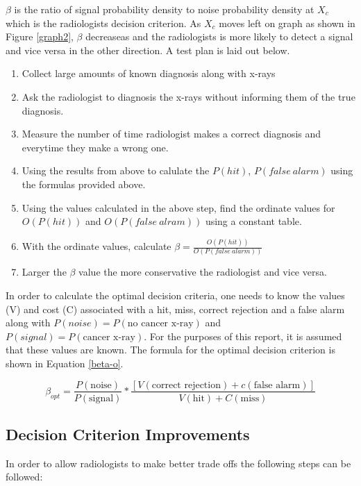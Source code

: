 \documentclass[12pt]{article}
\begin{document}
	$\beta$ is the ratio of signal probability density to noise probability density at $X_c$ which is the radiologists decision criterion. As $X_c$ moves left on graph as shown in Figure \ref{graph2}, $\beta$ decreaseas and the radiologists is more likely to detect a signal and vice versa in the other direction. A test plan is laid out below.
	
	\begin{enumerate}
		\item Collect large amounts of known diagnosis along with x-rays
		\item Ask the radiologist to diagnosis the x-rays without informing them of the true diagnosis.
		\item Measure the number of time radiologist makes a correct diagnosis and everytime they make a wrong one.
		\item Using the results from above to calulate the $P(hit)$, $P(false\ alarm)$ using the formulas provided above.
		\item Using the values calculated in the above step, find the ordinate values for $O(P(hit))$ and $O(P(false\ alram))$ using a constant table.
		\item With the ordinate values, calculate $\beta = \frac{O(P(hit))}{O(P(false\ alarm))}$
		\item Larger the $\beta$ value the more conservative the radiologist and vice versa.
	\end{enumerate}
	
	In order to calculate the optimal decision criteria, one needs to know the values (V) and cost (C) associated with a hit, miss, correct rejection and a false alarm along with $P(noise) = P(\text{no cancer x-ray})$ and $P(signal) = P(\text{cancer x-ray})$. For the purposes of this report, it is assumed that these values are known. The formula for the optimal decision criterion is shown in Equation \ref{beta-o}.
	
	\begin{equation}
		\beta_{opt} = \frac{P(\text{noise})}{P(\text{signal})} * \frac{[V(\text{correct rejection}) + c(\text{false alarm})]}{V(\text{hit}) + C(\text{miss})}
		\label{beta-o}
	\end{equation}
	
	\subsection{Decision Criterion Improvements}
	In order to allow radiologists to make better trade offs the following steps can be followed:
	
\end{document}
